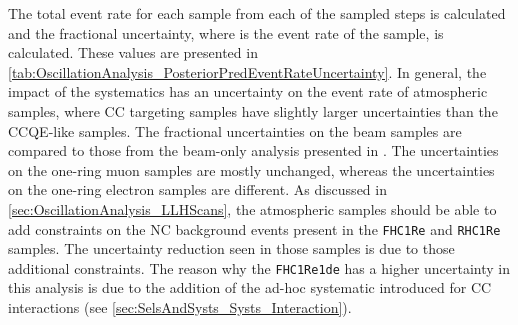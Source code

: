 The total event rate for each sample from each of the sampled steps is calculated and the fractional uncertainty,  where  is the event rate of the  sample, is calculated. These values are presented in \autoref{tab:OscillationAnalysis_PosteriorPredEventRateUncertainty}. In general, the impact of the systematics has an  uncertainty on the event rate of atmospheric samples, where CC\quickmath{1\pi} targeting samples have slightly larger uncertainties than the CCQE-like samples.
The fractional uncertainties on the beam samples are compared to those from the beam-only analysis presented in \cite{Dunne2020-uf, t2k_tn_393}. The uncertainties on the one-ring muon samples are mostly unchanged, whereas the uncertainties on the one-ring electron samples are different. As discussed in \autoref{sec:OscillationAnalysis_LLHScans}, the atmospheric samples should be able to add constraints on the NC background events present in the \texttt{FHC1Re} and \texttt{RHC1Re} samples. The uncertainty reduction seen in those samples is due to those additional constraints. The reason why the \texttt{FHC1Re1de} has a higher uncertainty in this analysis is due to the addition of the ad-hoc systematic introduced for CC\quickmath{1\pi} interactions (see \autoref{sec:SelsAndSysts_Systs_Interaction}).


